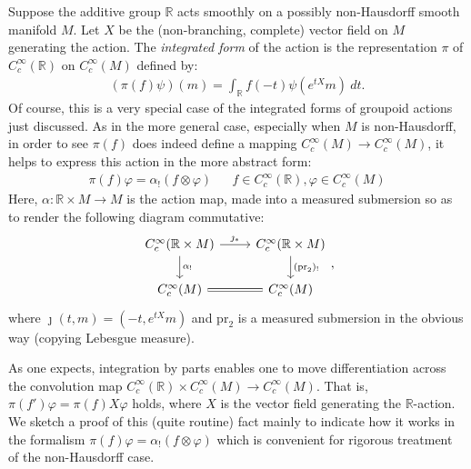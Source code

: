 \documentclass[12pt]{article}
\theoremstyle{plain}
\theoremstyle{definition}
\newcommand{\R}{\mathbb{R}}
\numberwithin{equation}{section}
\begin{document}
Suppose the additive group $\R$ acts smoothly on a possibly non-Hausdorff smooth manifold $M$. Let $X$ be the (non-branching, complete)  vector field on $M$ generating the action. The \emph{integrated form} of the action is the representation $\pi$ of $C_c^\infty(\R)$  on $C_c^\infty(M)$ defined by:
\begin{align}\label{Rint}
(\pi(f)\psi )(m) = \int_\R f(-t) \psi (e^{tX}m) \ dt. 
\end{align}
Of course, this is a very special case of the integrated forms of  groupoid actions just discussed. As in the more general case, especially when $M$ is non-Hausdorff, in order to see $\pi(f)$ does indeed define a mapping $C_c^\infty(M) \to C_c^\infty(M)$, it helps to express this action in the more abstract form:
\begin{align*} \pi(f) \varphi = \alpha_!( f \otimes \varphi) && f \in C_c^\infty(\R), \varphi \in C_c^\infty(M) \end{align*}
Here, $\alpha : \R \times M \to M$ is the action map, made into a measured submersion so as to render the following diagram commutative:
\[ \begin{tikzcd}
C_c^\infty(\R \times  M)   \ar[r,"{\jmath_*}"] \ar[d,"{\alpha_!}"] & C_c^\infty(\R \times  M) \ar[d,"(\mathrm{pr}_2)_!"] \\
C_c^\infty(M) \ar[r,equals] & C_c^\infty(M) 
\end{tikzcd},\]
where $\jmath(t,m)=(-t,e^{tX}m)$ and $\mathrm{pr}_2$ is  a measured submersion in the obvious way (copying Lebesgue measure).

As one expects, integration by parts enables  one to move differentiation  across the convolution map $C_c^\infty(\R) \times C_c^\infty(M) \to C_c^\infty(M)$. That is, $\pi(f')\varphi = \pi(f) X\varphi$ holds, where $X$ is the vector field generating the $\R$-action. We sketch a proof of this (quite routine) fact mainly to  indicate how it works in the formalism $\pi(f) \varphi = \alpha_!( f \otimes \varphi)$ which is convenient for rigorous treatment of the non-Hausdorff case.
\end{document}

